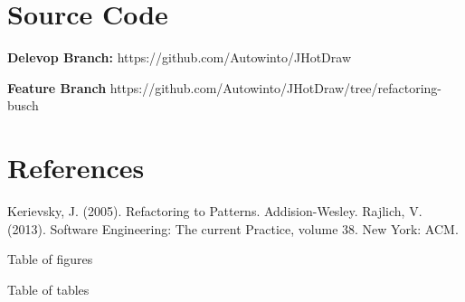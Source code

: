 \section{Source Code}


\textbf{Delevop Branch:}
https://github.com/Autowinto/JHotDraw

\textbf{Feature Branch}
https://github.com/Autowinto/JHotDraw/tree/refactoring-busch

\section{References}

Kerievsky, J. (2005). Refactoring to Patterns. Addision-Wesley.
Rajlich, V. (2013). Software Engineering: The current Practice, volume 38. New York: ACM.

Table of figures
\listoffigures

Table of tables
\listoftables